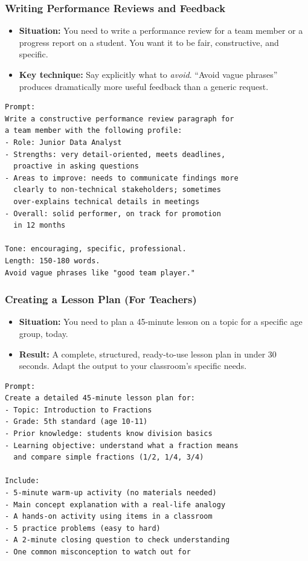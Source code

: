 \begin{frame}[fragile]\frametitle{Writing Performance Reviews and Feedback}

    \begin{itemize}
        \item \textbf{Situation:} You need to write a performance review for a team member or a progress report on a student. You want it to be fair, constructive, and specific.
        \item \textbf{Key technique:} Say explicitly what to \emph{avoid}. ``Avoid vague phrases'' produces dramatically more useful feedback than a generic request.
    \end{itemize}

\begin{lstlisting}[language=HTML]
Prompt:
Write a constructive performance review paragraph for 
a team member with the following profile:
- Role: Junior Data Analyst
- Strengths: very detail-oriented, meets deadlines, 
  proactive in asking questions
- Areas to improve: needs to communicate findings more 
  clearly to non-technical stakeholders; sometimes 
  over-explains technical details in meetings
- Overall: solid performer, on track for promotion 
  in 12 months

Tone: encouraging, specific, professional.
Length: 150-180 words.
Avoid vague phrases like "good team player."
\end{lstlisting}



\end{frame}


\begin{frame}[fragile]\frametitle{Creating a Lesson Plan (For Teachers)}

    \begin{itemize}
        \item \textbf{Situation:} You need to plan a 45-minute lesson on a topic for a specific age group, today.
        \item \textbf{Result:} A complete, structured, ready-to-use lesson plan in under 30 seconds. Adapt the output to your classroom's specific needs.
    \end{itemize}
		
\begin{lstlisting}[language=HTML]
Prompt:
Create a detailed 45-minute lesson plan for:
- Topic: Introduction to Fractions
- Grade: 5th standard (age 10-11)
- Prior knowledge: students know division basics
- Learning objective: understand what a fraction means 
  and compare simple fractions (1/2, 1/4, 3/4)

Include:
- 5-minute warm-up activity (no materials needed)
- Main concept explanation with a real-life analogy
- A hands-on activity using items in a classroom
- 5 practice problems (easy to hard)
- A 2-minute closing question to check understanding
- One common misconception to watch out for
\end{lstlisting}



\end{frame}


